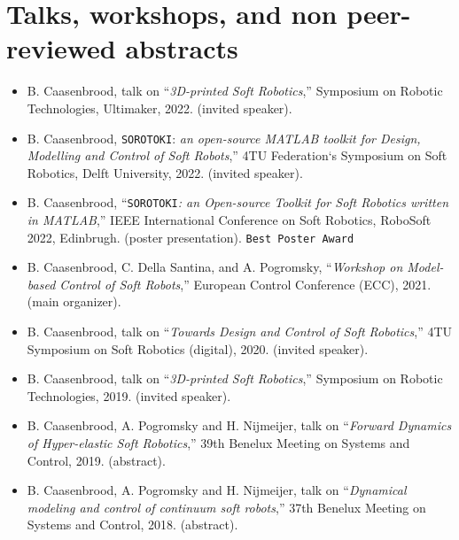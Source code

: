 \section*{Talks, workshops, and non peer-reviewed abstracts}
\begin{itemize}[leftmargin=4mm]
\item B. Caasenbrood, talk on  “\textit{3D-printed Soft Robotics},” Symposium on Robotic Technologies, Ultimaker, 2022. (invited speaker).
\item B. Caasenbrood, \texttt{SOROTOKI}: \textit{an open-source MATLAB toolkit for Design, Modelling and Control of Soft Robots},”   4TU Federation`s Symposium on Soft Robotics, Delft University, 2022. (invited speaker).
\item B. Caasenbrood, “\texttt{SOROTOKI}\textit{: an Open-source Toolkit for Soft Robotics written in MATLAB},”  IEEE International Conference on Soft Robotics, RoboSoft 2022, Edinbrugh. (poster presentation). \texttt{Best Poster Award}
\item B. Caasenbrood, C. Della Santina, and A. Pogromsky, “\textit{Workshop on Model-based Control of Soft Robots},” European Control Conference (ECC), 2021. (main organizer).
\item B. Caasenbrood, talk on  “\textit{Towards Design and Control of Soft Robotics},” 4TU Symposium on Soft Robotics (digital), 2020. (invited speaker).
\item B. Caasenbrood, talk on  “\textit{3D-printed Soft Robotics},” Symposium on Robotic Technologies, 2019. (invited speaker).
\item B. Caasenbrood, A. Pogromsky and H. Nijmeijer, talk on  “\textit{Forward Dynamics of Hyper-elastic Soft Robotics},” 39th Benelux Meeting on Systems and Control, 2019. (abstract).
\item B. Caasenbrood, A. Pogromsky and H. Nijmeijer, talk on  “\textit{Dynamical modeling and control of continuum soft robots},” 37th Benelux Meeting on Systems and Control, 2018. (abstract).
\end{itemize}
